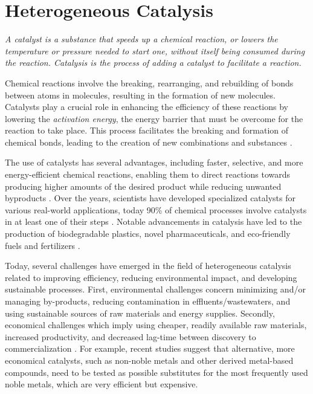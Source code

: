 \section{Heterogeneous Catalysis}\label{sec:Catalysis}

\textit{
A catalyst is a substance that speeds up a chemical reaction, or lowers the temperature or pressure needed to start one, without itself being consumed during the reaction.
Catalysis is the process of adding a catalyst to facilitate a reaction.
}

Chemical reactions involve the breaking, rearranging, and rebuilding of bonds between atoms in molecules, resulting in the formation of new molecules.
Catalysts play a crucial role in enhancing the efficiency of these reactions by lowering the \textit{activation energy}, the energy barrier that must be overcome for the reaction to take place.
This process facilitates the breaking and formation of chemical bonds, leading to the creation of new combinations and substances \parencite{Schlogl2015}.

The use of catalysts has several advantages, including faster, selective, and more energy-efficient chemical reactions, enabling them to direct reactions towards producing higher amounts of the desired product while reducing unwanted byproducts \parencite{Schlogl2015}.
Over the years, scientists have developed specialized catalysts for various real-world applications, today 90\% of chemical processes involve catalysts in at least one of their steps \parencite{WEINER1998915, DeVries2012}.
Notable advancements in catalysis have led to the production of biodegradable plastics, novel pharmaceuticals, and eco-friendly fuels and fertilizers \parencite{FECHETE20122}.

Today, several challenges have emerged in the field of heterogeneous catalysis related to improving efficiency, reducing environmental impact, and developing sustainable processes.
First, environmental challenges concern minimizing and/or managing by-products, reducing contamination in effluents/wastewaters, and using sustainable sources of raw materials \parencite{LUDWIG2017313, Lange2021} and energy supplies.
Secondly, economical challenges which imply using cheaper, readily available raw materials, increased productivity, and decreased lag-time between discovery to commercialization \parencite{Keisuke2019, Gunay2021}.
For example, recent studies suggest that alternative, more economical catalysts, such as non-noble metals \parencite{Zhong2021} and other derived metal-based compounds, need to be tested as possible substitutes for the most frequently used noble metals, which are very efficient but expensive.

